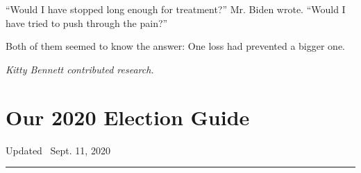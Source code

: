 ``Would I have stopped long enough for treatment?'' Mr. Biden wrote.
``Would I have tried to push through the pain?''

Both of them seemed to know the answer: One loss had prevented a bigger
one.

\emph{Kitty Bennett contributed research.}

\hypertarget{our-2020-election-guide}{%
\section{Our 2020 Election Guide}\label{our-2020-election-guide}}

Updated ~Sept. 11, 2020

\begin{center}\rule{0.5\linewidth}{\linethickness}\end{center}

